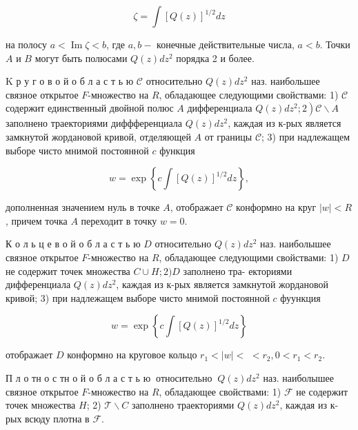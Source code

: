 \documentclass[10pt]{article}
\begin{document}
\[

\zeta=\int[Q(z)]^{1 / 2} d z

\]



на полосу $a<\operatorname{Im} \zeta<b$, где $a, b-$ конечные действительные числа, $a<b$. Точки $A$ и $B$ могут быть полюсами $Q(z) d z^{2}$ порядка 2 и более.



$\mathrm{K}$ р у г о в о й о б л а с т ь ю $\mathscr{C}$ относительно $Q(z) d z^{2}$ наз. наибольшее связное открытое $F$-множество на $R$, обладающее следующими свойствами: 1) $\mathscr{C}$ содержит единственный двойной полюс $A$ дифференциала $\left.Q(z) d z^{2} ; 2\right) \mathscr{C} \backslash A$ заполнено траекториями диффференциала $Q(z) d z^{2}$, каждая из к-рых является замкнутой жордановой кривой, отделяющей $A$ от границы $\mathscr{C}$; 3) при надлежащем выборе чисто мнимой постоянной $c$ функция



\[

w=\exp \left\{c \int[Q(z)]^{1 / 2} d z\right\},

\]



дополненная значением нуль в точке $A$, отображает $\mathscr{C}$ конформно на круг $|w|<R$, причем точка $A$ переходит в точку $w=0$.



К о л ь ц е в о й о б л а с т ь ю $D$ относительно $Q(z) d z^{2}$ наз. наиболышее связное открытое $F$-множество на $R$, обладающее следующими свойствами: 1) $D$ не содержит точек множества $C \cup H ; 2) D$ заполнено тра- екториями дифференциала $Q(z) d z^{2}$, каждая из к-рых является замкнутой жордановой кривой; 3) при надлежащем выборе чисто мнимой постоянной $c$ фуункция



\[

w=\exp \left\{c \int[Q(z)]^{1 / 2} d z\right\}

\]



отображает $D$ конформно на круговое кольцо $r_{1}<|w|<$ $<r_{2}, 0<r_{1}<r_{2}$.



П л о тн о с тн о й о б л а с т ь ю $\mathscr{~ о т н о с и т е л ь н о ~}$ $Q(z) d z^{2}$ наз. наиболышее связное открытое $F$-множество на $R$, обладающее свойствами: 1) $\mathscr{F}$ не содержит точек множества $H$; 2) $\mathscr{T} \backslash C$ заполнено траекториями $Q(z) d z^{2}$, каждая из к-рых всюду плотна в $\mathscr{F}$.
\end{document}
